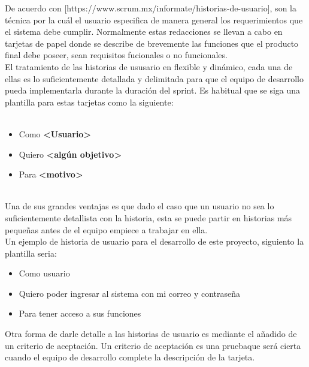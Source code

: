 De acuerdo con [https://www.scrum.mx/informate/historias-de-usuario], son la técnica por la cuál el usuario especifica de manera general
los requerimientos que el sistema debe cumplir.
Normalmente estas redacciones se llevan a cabo en tarjetas de papel donde se describe de brevemente las funciones que el producto final
debe poseer, sean requisitos fucionales o no funcionales.\\
El tratamiento de las historias de ususario en flexible y dinámico, cada una de ellas es lo suficientemente detallada y delimitada para que
el equipo de desarrollo pueda implementarla durante la duración del sprint. Es habitual que se siga una plantilla para estas tarjetas como la siguiente:\\
\\
\begin{itemize}
	\item Como \textbf{<Usuario>}
	\item Quiero \textbf{<algún objetivo>}
	\item Para \textbf{<motivo>}
\end{itemize}
\\
Una de sus grandes ventajas es que dado el caso que un usuario no sea lo suficientemente detallista con la historia, esta se puede partir en historias más pequeñas
antes de el equipo empiece a trabajar en ella.\\
Un ejemplo de historia de usuario para el desarrollo de este proyecto, siguiento la plantilla seria:\\

\begin{itemize}
	\item Como usuario
	\item Quiero poder ingresar al sistema con mi correo y contraseña
	\item Para tener acceso a sus funciones
\end{itemize}

Otra forma de darle detalle a las historias de usuario es mediante el añadido de un criterio de aceptación. Un criterio de aceptación es una pruebaque será cierta
cuando el equipo de desarrollo complete la descripción de la tarjeta.\\

